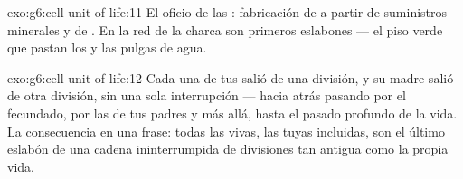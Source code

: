 \begin{solution}{exo:g6:cell-unit-of-life:11}
El oficio de las : fabricación  de  a partir de suministros minerales y de . En la red de la
charca son primeros eslabones --- el piso verde que pastan los
 y las pulgas de agua.
\end{solution}

\begin{solution}{exo:g6:cell-unit-of-life:12}
Cada una de tus  salió de una división, y su  madre salió
de otra división, sin una sola interrupción --- hacia atrás pasando por
el  fecundado, por las  de tus padres y más allá, hasta el
pasado profundo de la vida. La consecuencia en una frase: todas las
 vivas, las tuyas incluidas, son el último eslabón de una cadena
ininterrumpida de divisiones tan antigua como la propia vida.
\end{solution}

